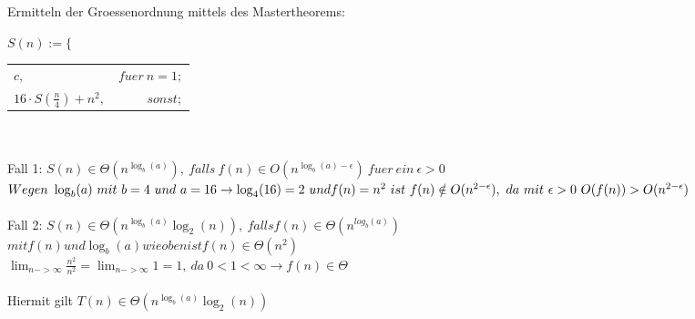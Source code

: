 Ermitteln der Groessenordnung mittels des Mastertheorems:
 
$ S(n) :=  \{ $
\begin{tabular}{lr}
$c,$&$ fuer\ n = 1;$\\
$16 \cdot S(\frac{n}{4}) + n^2,$&$ sonst; $ \\
\end{tabular}\\\\
Fall 1: $S(n) \in \Theta(n^{\log_b(a)}),\ falls\ f(n) \in O(n^{\log_b(a)-\epsilon})\ fuer\ ein\ \epsilon>0$\\
$Wegen\ \log_b(a)\ mit\ b=4\ und\ a=16 \to \log_4(16)=2\ und\\ f(n)=n^2\ ist\ f(n) \notin O(n^{2-\epsilon}),\ da\ mit\ \epsilon > 0\ O(f(n)) > O(n^{2- \epsilon})$\\\\
Fall 2: $S(n) \in \Theta(n^{\log_b(a)}\log_2(n)),\ falls f(n) \in \Theta(n^{log_b(a)})$\\
$mit f(n) und \log_b(a) wie oben ist f(n) \in \Theta(n^2)$\\
$\lim_{n->\infty} \frac{n^2}{n^2} = \lim_{n->\infty} 1 = 1,\ da\ 0 < 1 < \infty \to f(n) \in \Theta$\\\\
Hiermit gilt $T(n) \in \Theta(n^{\log_b(a)}\log_2(n))$


